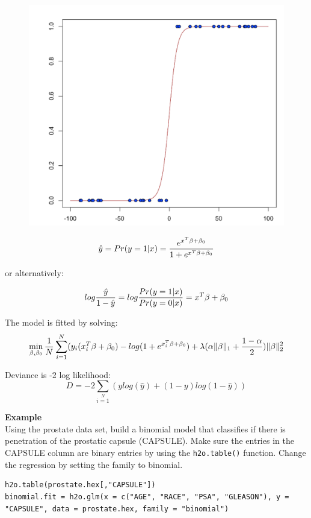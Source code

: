 \begin{figure}[h]
\centering
\includegraphics[scale=0.5]{images/scurve.png}
\end{figure}


 

\[ \hat{y} = Pr(y = 1|x) = {e^{x^T\beta + \beta_0} \over 1 + e^{x^T \beta + \beta_0} } \]

or alternatively:


\[log {\hat{y} \over 1- \hat{y}} = log{Pr(y=1|x) \over Pr(y=0|x)} = x^T \beta + \beta_0\]

The model is fitted by solving:
\[  \min\limits_{\beta,\beta_0} { {1 \over N}\sum\limits_{i=1}\limits^{N}(y_i (x_i^{T}\beta  + \beta_0) - log (1 + e^{x_i^{T}\beta  + \beta_0} )  + \lambda (\alpha \|\beta \|_1 + {1-\alpha \over 2}) \| \beta \|_2^2} \]

Deviance is -2 log likelihood:
\[D = -2\sum\limits_{i=1}\limits^{N}{(y log(\hat{y}) + (1 - y)log(1-\hat{y})  )}\]

\textbf{Example}\\

Using the prostate data set, build a binomial model that classifies if there is penetration of the prostatic capsule (CAPSULE). Make sure the entries in the CAPSULE column are binary entries by using the \texttt{h2o.table()} function. Change the regression by setting the family to binomial.
\begin{lstlisting}[style=R]
h2o.table(prostate.hex[,"CAPSULE"])
binomial.fit = h2o.glm(x = c("AGE", "RACE", "PSA", "GLEASON"), y = "CAPSULE", data = prostate.hex, family = "binomial")
\end{lstlisting}

